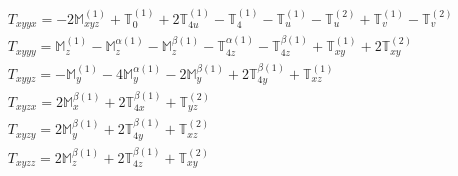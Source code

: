 \documentclass[fleqn,8pt,landscape]{jsarticle}
\begin{document}
\begin{align*}
& T_{xyyx} = - 2 \mathbb{M}_{xyz}^{(1)} + \mathbb{T}_{0}^{(1)} + 2 \mathbb{T}_{4u}^{(1)} - \mathbb{T}_{4}^{(1)} - \mathbb{T}_{u}^{(1)} - \mathbb{T}_{u}^{(2)} + \mathbb{T}_{v}^{(1)} - \mathbb{T}_{v}^{(2)} \\
& T_{xyyy} = \mathbb{M}_{z}^{(1)} - \mathbb{M}_{z}^{\alpha(1)} - \mathbb{M}_{z}^{\beta(1)} - \mathbb{T}_{4z}^{\alpha(1)} - \mathbb{T}_{4z}^{\beta(1)} + \mathbb{T}_{xy}^{(1)} + 2 \mathbb{T}_{xy}^{(2)} \\
& T_{xyyz} = - \mathbb{M}_{y}^{(1)} - 4 \mathbb{M}_{y}^{\alpha(1)} - 2 \mathbb{M}_{y}^{\beta(1)} + 2 \mathbb{T}_{4y}^{\beta(1)} + \mathbb{T}_{xz}^{(1)} \\
& T_{xyzx} = 2 \mathbb{M}_{x}^{\beta(1)} + 2 \mathbb{T}_{4x}^{\beta(1)} + \mathbb{T}_{yz}^{(2)} \\
& T_{xyzy} = 2 \mathbb{M}_{y}^{\beta(1)} + 2 \mathbb{T}_{4y}^{\beta(1)} + \mathbb{T}_{xz}^{(2)} \\
& T_{xyzz} = 2 \mathbb{M}_{z}^{\beta(1)} + 2 \mathbb{T}_{4z}^{\beta(1)} + \mathbb{T}_{xy}^{(2)}
\end{align*}
\end{document}
